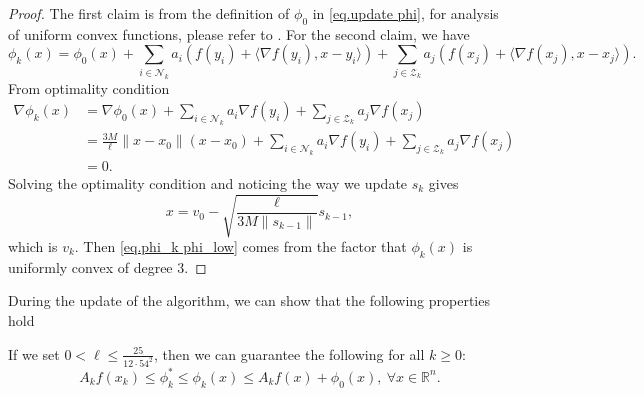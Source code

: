 \documentclass{article}
\begin{document}
\begin{proof}
    The first claim is from the definition of $\phi_0$ in \eqref{eq.update phi}, for analysis of uniform convex functions, please refer to \citet[Section 4.2.2]{nesterov_lectures_2018}. For the second claim, we have
    \begin{equation}
        \label{eq.phi recursive}
        \phi_k(x) = \phi_0(x)+\sum_{i\in \mathcal{N}_{k}}a_i\left (f(y_i)+\langle \nabla f(y_i),x-y_i\rangle \right)+\sum_{j\in \mathcal{Z}_{k}}a_j\left (f(x_j)+\langle \nabla f(x_j),x-x_j\rangle \right).
    \end{equation}
    From optimality condition
    \begin{equation*}
    \begin{aligned}
        \nabla \phi_k(x) &= \nabla \phi_0(x)+\sum_{i\in \mathcal{N}_k}a_i\nabla f(y_i)+ \sum_{j\in \mathcal{Z}_k}a_j\nabla f(x_j)\\
        &= \frac{3M}{\ell}\|x-x_0\|(x-x_0)+\sum_{i\in \mathcal{N}_k}a_i\nabla f(y_i)+ \sum_{j\in \mathcal{Z}_k}a_j\nabla f(x_j)\\
        &=0.
    \end{aligned}
    \end{equation*}
    Solving the optimality condition and noticing the way we update $s_k$ gives 
    \begin{equation*}
        x = v_0 - \sqrt{\frac{\ell}{3M\|s_{k-1}\|}}s_{k-1},
    \end{equation*}
    which is $v_k$. Then \eqref{eq.phi_k phi_low} comes from the factor that $\phi_k(x)$ is uniformly convex of degree 3.
\end{proof}
During the update of the algorithm, we can show that the following properties hold
\begin{lemma}\label{lem.estimate sequence}
If we set $0<\ell \leq\frac{25}{12\cdot 54^2}$, then we can guarantee the following for all $k\geq 0$:
\begin{equation}
    \label{eq.estimating sequence relation}
    A_k f(x_k)\leq \phi_k^*  \leq \phi_k(x)\leq A_k f(x)+\phi_0(x), \ \forall x\in \mathbb{R}^n.
\end{equation}
\end{lemma}
\end{document}

